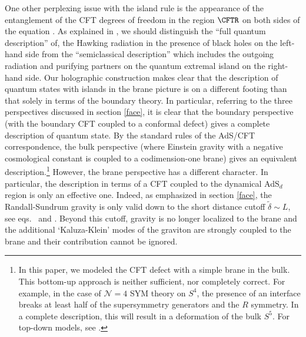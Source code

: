 One other perplexing issue with the island rule  is the appearance of the entanglement of the CFT degrees of freedom in the region $\CFTR$ on both sides of the equation \cite{Almheiri:2019hni}. As explained in \cite{Almheiri:2019yqk}, we should distinguish the ``full quantum description'' of, \eg the Hawking radiation in the presence of black holes on the left-hand side from the ``semiclassical description'' which includes the outgoing radiation and purifying partners on the quantum extremal island on the right-hand side. Our holographic construction makes clear that the description of quantum states with islands in the brane picture is on a different footing than that solely in terms of the boundary theory. In particular, referring to the three perspectives discussed in section \ref{face}, it is clear that the boundary perspective (with the boundary CFT coupled to a conformal defect) gives a complete description of quantum state.  By the standard rules of the AdS/CFT correspondence, the bulk perspective (where Einstein gravity with a negative cosmological constant is coupled to a codimension-one brane) gives an equivalent description.\footnote{In this paper, we modeled the CFT defect with a simple brane in the bulk. This bottom-up approach is neither sufficient, nor completely correct. For example, in the case of $\mathcal N=4$ SYM theory on $S^4$, the presence of an interface breaks at least half of the supersymmetry generators and the $R$ symmetry. In a complete description, this will result in a deformation of the bulk $S^5$. For top-down models, see \cite{Karch:2001cw,DeWolfe:2001pq, DHoker:2007hhe, DHoker:2008rje, Chiodaroli:2009yw, Chiodaroli:2011nr, Chiodaroli:2012vc}. }
However, the brane perspective has a different character. In particular, the description in terms of a CFT coupled to the dynamical AdS$_d$ region is only an effective one. Indeed, as emphasized in section \ref{face}, the Randall-Sundrum gravity is only valid down to  the short distance cutoff $\tilde\delta\sim L$, \ie see eqs.~ and . Beyond this cutoff, gravity is no longer localized to the brane and the additional `Kaluza-Klein' modes of the graviton are strongly coupled to the brane and their contribution cannot be ignored. 

